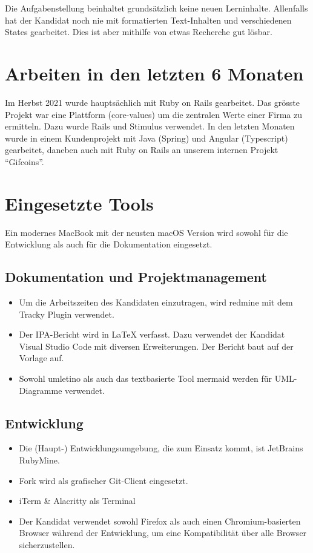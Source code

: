 Die Aufgabenstellung beinhaltet grundsätzlich keine neuen Lerninhalte. Allenfalls hat der Kandidat noch nie mit formatierten Text-Inhalten und verschiedenen States gearbeitet. Dies ist aber mithilfe von etwas Recherche gut lösbar.

\section{Arbeiten in den letzten 6 Monaten}

Im Herbst 2021 wurde hauptsächlich mit Ruby on Rails gearbeitet. Das grösste Projekt war eine Plattform (core-values) um die zentralen Werte einer Firma zu ermitteln.
Dazu wurde Rails und Stimulus verwendet. In den letzten Monaten wurde in einem Kundenprojekt mit Java (Spring) und Angular (Typescript) gearbeitet, daneben auch mit Ruby on Rails an unserem internen Projekt “Gifcoins”.

\section{Eingesetzte Tools}

Ein modernes MacBook mit der neusten macOS Version wird sowohl für die Entwicklung als auch für die Dokumentation eingesetzt.

\subsection{Dokumentation und Projektmanagement}

\begin{itemize}
    \item Um die Arbeitszeiten des Kandidaten einzutragen, wird redmine mit dem Tracky Plugin verwendet.
    \item Der IPA-Bericht wird in LaTeX verfasst. Dazu verwendet der Kandidat Visual Studio Code mit diversen Erweiterungen.
          Der Bericht baut auf der Vorlage \cite{Buhler_ipa-template_2022} auf.
    \item Sowohl umletino als auch das textbasierte Tool mermaid werden für UML-Diagramme verwendet.
\end{itemize}

\subsection{Entwicklung}

\begin{itemize}
    \item Die (Haupt-) Entwicklungsumgebung, die zum Einsatz kommt, ist JetBrains RubyMine.
    \item Fork wird als grafischer Git-Client eingesetzt.
    \item iTerm \& Alacritty als Terminal
    \item Der Kandidat verwendet sowohl Firefox als auch einen Chromium-basierten Browser während der Entwicklung, um eine Kompatibilität über alle Browser sicherzustellen.
\end{itemize}
